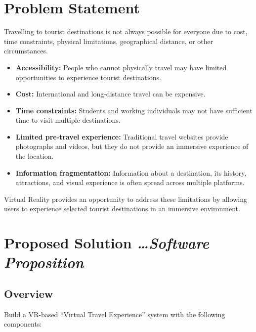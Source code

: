 \documentclass[11pt,a4paper]{article}
\newcommand{\BvrHint}[1]{%
  {\normalfont\normalsize\itshape\hfill #1}}
\begin{document}
\section{Problem Statement}

Travelling to tourist destinations is not always possible for everyone due to cost, time constraints,
physical limitations, geographical distance, or other circumstances.

\begin{itemize}[leftmargin=0.7cm]
    \item \textbf{Accessibility:} People who cannot physically travel may have limited opportunities to experience tourist destinations.
    \item \textbf{Cost:} International and long-distance travel can be expensive.
    \item \textbf{Time constraints:} Students and working individuals may not have sufficient time to visit multiple destinations.
    \item \textbf{Limited pre-travel experience:} Traditional travel websites provide photographs and videos, but they do not provide an immersive experience of the location.
    \item \textbf{Information fragmentation:} Information about a destination, its history, attractions, and visual experience is often spread across multiple platforms.
\end{itemize}

Virtual Reality provides an opportunity to address these limitations by allowing users to experience
selected tourist destinations in an immersive environment.

\section{Proposed Solution%
  \BvrHint{\ldots Software Proposition}}

\subsection{Overview}

Build a VR-based ``Virtual Travel Experience'' system with the following components:
\end{document}
